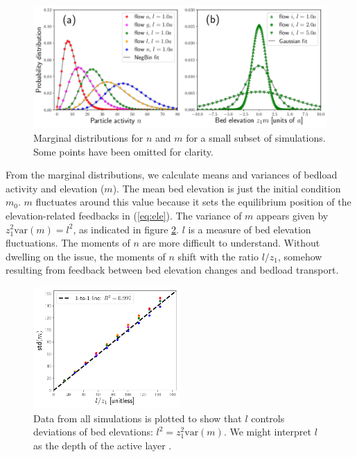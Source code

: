 \documentclass[draft]{agujournal2018}
\begin{document}
\begin{figure}[t!]
	\includegraphics[width=\linewidth,keepaspectratio]{./figures/montage2.pdf}
	\caption{Marginal distributions for $n$ and $m$ for a small subset of simulations. Some points have been omitted for clarity.}
	\label{fig:pdfs}
\end{figure}

From the marginal distributions, we calculate means and variances of bedload activity and elevation ($m$).
The mean bed elevation is just the initial condition $m_0$. $m$ fluctuates around this value because it sets the equilibrium position of the elevation-related feedbacks in (\ref{eq:ele}).
The variance of $m$ appears given by $z_1^2 \text{var}(m) = l^2$, as indicated in figure \ref{fig:var}.
$l$ is a measure of bed elevation fluctuations.
The moments of $n$ are more difficult to understand.
Without dwelling on the issue, the moments of $n$ shift with the ratio $l/z_1$, somehow resulting from feedback between bed elevation changes and bedload transport.

\begin{figure}
	\centering
	\includegraphics[width=0.5\textwidth,keepaspectratio]{./figures/variance.pdf}
	\caption{Data from all simulations is plotted to show that $l$ controls deviations of bed elevations: $l^2 = z_1^2\text{var}(m).$ We might interpret $l$ as the depth of the active layer \citep[e.g.][]{Church2017}.}
	\label{fig:var}
\end{figure}
\end{document}
